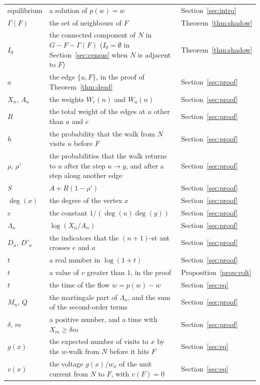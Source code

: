 \documentclass[11pt]{amsart}
\theoremstyle{remark}
\begin{document}
\begin{longtable}{@{}>{\raggedright\arraybackslash}p{}>{\raggedright\arraybackslash}p{}>{\raggedright\arraybackslash}p{}@{}}
equilibrium & a solution of $p(w)=w$ & Section~\ref{sec:intro} \\
$\Gamma(F)$ & the set of neighbours of $F$ & Theorem~\ref{thm:shadow} \\
$I_0$ & the connected component of $N$ in $G-F-\Gamma(F)$ ($I_0=\emptyset$ in Section~\ref{sec:census} when $N$ is adjacent to $F$) & Theorem~\ref{thm:shadow} \\
$a$ & the edge $\{u,F\}$, in the proof of Theorem~\ref{thm:dead} & Section~\ref{sec:proof} \\
$X_n$, $A_n$ & the weights $W_e(n)$ and $W_a(n)$ & Section~\ref{sec:proof} \\
$R$ & the total weight of the edges at $u$ other than $a$ and $e$ & Section~\ref{sec:proof} \\
$h$ & the probability that the walk from $N$ visits $u$ before $F$ & Section~\ref{sec:proof} \\
$\rho$, $\rho'$ & the probabilities that the walk returns to $u$ after the step $u\to y$, and after a step along another edge & Section~\ref{sec:proof} \\
$S$ & $A+R(1-\rho')$ & Section~\ref{sec:proof} \\
$\deg(x)$ & the degree of the vertex $x$ & Section~\ref{sec:proof} \\
$c$ & the constant $1/(\deg(u)\deg(y))$ & Section~\ref{sec:proof} \\
$\Lambda_n$ & $\log(X_n/A_n)$ & Section~\ref{sec:proof} \\
$D_n$, $D'_n$ & the indicators that the $(n+1)$-st ant crosses $e$ and $a$ & Section~\ref{sec:proof} \\
$t$ & a real number in $\log(1+t)$ & Section~\ref{sec:proof} \\
$t$ & a value of $v$ greater than $1$, in the proof & Proposition~\ref{prop:volt} \\
$t$ & the time of the flow $\dot w=p(w)-w$ & Section~\ref{sec:eq} \\
$M_n$, $Q$ & the martingale part of $\Lambda_n$, and the sum of the second-order terms & Section~\ref{sec:proof} \\
$\delta$, $m$ & a positive number, and a time with $X_m\ge\delta m$ & Section~\ref{sec:proof} \\
$g(x)$ & the expected number of visits to $x$ by the $w$-walk from $N$ before it hits $F$ & Section~\ref{sec:eq} \\
$v(x)$ & the voltage $g(x)/w_x$ of the unit current from $N$ to $F$, with $v(F)=0$ & Section~\ref{sec:eq} \\

\end{longtable}
\end{document}
